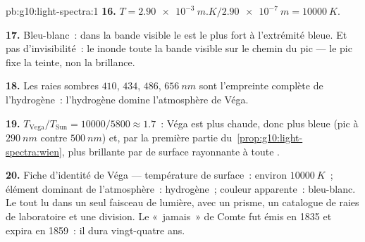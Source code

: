 \begin{solution}{pb:g10:light-spectra:1}
\textbf{16.} $T = \qty{2.90e-3}{m.K} / \qty{2.90e-7}{m}
= \qty{10000}{K}$.

\textbf{17.} Bleu-blanc~: dans la bande visible le  est le
plus fort à l'extrémité bleue. Et pas d'invisibilité~: le
 inonde toute la bande visible sur le chemin du
pic  --- le pic fixe la teinte, non la brillance.

\textbf{18.} Les raies sombres $410$, $434$, $486$, $\qty{656}{nm}$ sont
l'empreinte complète de l'hydrogène~: l'hydrogène domine l'atmosphère
de Véga.

\textbf{19.} $T_{\text{Vega}} / T_{\text{Sun}} = 10000 / 5800 \approx
1.7$~: Véga est plus chaude, donc plus bleue (pic à $\qty{290}{nm}$
contre $\qty{500}{nm}$) et, par la première partie
du~\cref{prop:g10:light-spectra:wien}, plus brillante par
 de surface rayonnante à toute
.

\textbf{20.} Fiche d'identité de Véga --- température de surface~:
environ $\qty{10000}{K}$~; élément dominant de l'atmosphère~:
hydrogène~; couleur apparente~: bleu-blanc. Le tout lu dans un seul
faisceau de lumière, avec un prisme, un catalogue de raies de
laboratoire et une division. Le «~jamais~» de Comte fut émis en 1835
et expira en 1859~: il dura vingt-quatre ans.
\end{solution}
